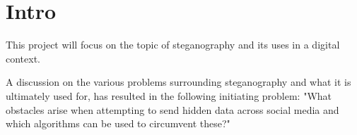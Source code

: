 \section*{Intro}
This project will focus on the topic of steganography and its uses in a digital context.

A discussion on the various problems surrounding steganography and what it is ultimately used for, has resulted in the following initiating problem: 
"What obstacles arise when attempting to send hidden data across social media and which algorithms can be used to circumvent these?"